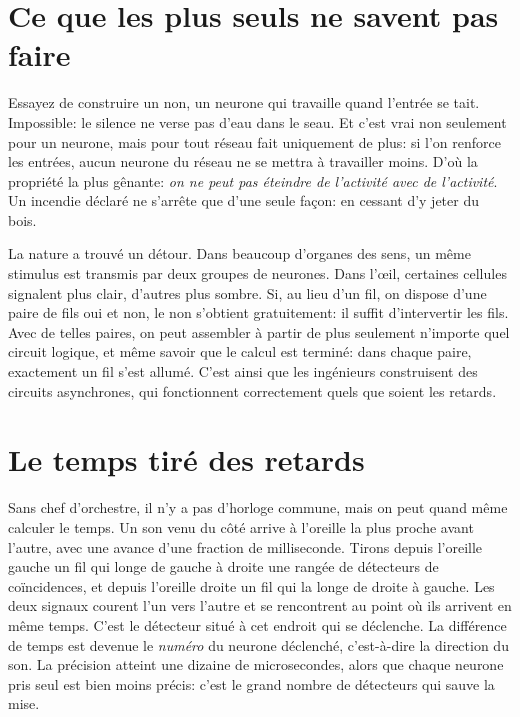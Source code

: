 \section*{Ce que les \og plus\fg{} seuls ne savent pas faire}

Essayez de construire un \og non\fg{}, un neurone qui travaille quand l'entrée se tait. Impossible: le silence ne verse pas d'eau dans le seau. Et c'est vrai non seulement pour un neurone, mais pour tout réseau fait uniquement de \og plus\fg{}: si l'on renforce les entrées, aucun neurone du réseau ne se mettra à travailler moins. D'où la propriété la plus gênante: \emph{on ne peut pas éteindre de l'activité avec de l'activité}. Un incendie déclaré ne s'arrête que d'une seule façon: en cessant d'y jeter du bois.

La nature a trouvé un détour. Dans beaucoup d'organes des sens, un même stimulus est transmis par deux groupes de neurones. Dans l'œil, certaines cellules signalent \og plus clair\fg{}, d'autres \og plus sombre\fg{}. Si, au lieu d'un fil, on dispose d'une paire de fils \og oui\fg{} et \og non\fg{}, le \og non\fg{} s'obtient gratuitement: il suffit d'intervertir les fils. Avec de telles paires, on peut assembler à partir de \og plus\fg{} seulement n'importe quel circuit logique, et même savoir que le calcul est terminé: dans chaque paire, exactement un fil s'est allumé. C'est ainsi que les ingénieurs construisent des circuits asynchrones, qui fonctionnent correctement quels que soient les retards.

\section*{Le temps tiré des retards}

Sans chef d'orchestre, il n'y a pas d'horloge commune, mais on peut quand même calculer le temps. Un son venu du côté arrive à l'oreille la plus proche avant l'autre, avec une avance d'une fraction de milliseconde. Tirons depuis l'oreille gauche un fil qui longe de gauche à droite une rangée de détecteurs de coïncidences, et depuis l'oreille droite un fil qui la longe de droite à gauche. Les deux signaux courent l'un vers l'autre et se rencontrent au point où ils arrivent en même temps. C'est le détecteur situé à cet endroit qui se déclenche. La différence de temps est devenue le \emph{numéro} du neurone déclenché, c'est-à-dire la direction du son. La précision atteint une dizaine de microsecondes, alors que chaque neurone pris seul est bien moins précis: c'est le grand nombre de détecteurs qui sauve la mise.

